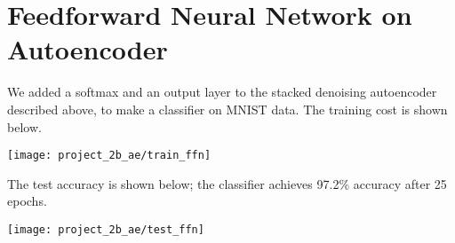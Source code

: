 \section*{Feedforward Neural Network on Autoencoder}

We added a softmax and an output layer to the stacked denoising autoencoder
described above, to make a classifier on MNIST data. The training cost is shown 
below.

\begin{center}
    \texttt{[image: project\_2b\_ae/train\_ffn]}
\end{center}

The test accuracy is shown below; the classifier achieves 97.2\% accuracy after
25 epochs.

\begin{center}
    \texttt{[image: project\_2b\_ae/test\_ffn]}
\end{center}